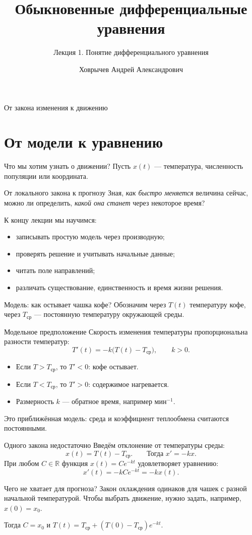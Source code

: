 \documentclass[aspectratio=169,11pt]{beamer}
\title[Понятие ОДУ]{Обыкновенные дифференциальные уравнения}
\subtitle{Лекция 1. Понятие дифференциального уравнения}
\author[Ховрычев А. А.]{Ховрычев Андрей Александрович}
\institute[УрФУ]{ФИИТ, УрФУ}
\date{}
\newcommand{\R}{\mathbb R}
\begin{document}
\begin{frame}
  \titlepage
  \centering От закона изменения к движению
\end{frame}

\section{От модели к уравнению}
\begin{frame}{Что мы хотим узнать о движении?}
  Пусть $x(t)$ --- температура, численность популяции или координата.
  \begin{block}{От локального закона к прогнозу}
    Зная, \emph{как быстро меняется} величина сейчас, можно ли определить,
    \emph{какой она станет} через некоторое время?
  \end{block}
  К концу лекции мы научимся:
  \begin{itemize}
    \item записывать простую модель через производную;
    \item проверять решение и учитывать начальные данные;
    \item читать поле направлений;
    \item различать существование, единственность и время жизни решения.
  \end{itemize}
\end{frame}

\begin{frame}{Модель: как остывает чашка кофе?}
  Обозначим через $T(t)$ температуру кофе, через $T_{\text{ср}}$ ---
  постоянную температуру окружающей среды.
  \begin{block}{Модельное предположение}
    Скорость изменения температуры пропорциональна разности температур:
    \[
      \boxed{T'(t)=-k\bigl(T(t)-T_{\text{ср}}\bigr)},\qquad k>0.
    \]
  \end{block}
  \begin{itemize}
    \item Если $T>T_{\text{ср}}$, то $T'<0$: кофе остывает.
    \item Если $T<T_{\text{ср}}$, то $T'>0$: содержимое нагревается.
    \item Размерность $k$ --- обратное время, например $\text{мин}^{-1}$.
  \end{itemize}
  Это приближённая модель: среда и коэффициент теплообмена считаются постоянными.
\end{frame}

\begin{frame}{Одного закона недостаточно}
  Введём отклонение от температуры среды:
  \[
    x(t)=T(t)-T_{\text{ср}}.\qquad \text{Тогда } x'=-kx.
  \]
  При любом $C\in\R$ функция $x(t)=Ce^{-kt}$ удовлетворяет уравнению:
  \[
    x'(t)=-kCe^{-kt}=-kx(t).
  \]
  \begin{alertblock}{Чего не хватает для прогноза?}
    Закон охлаждения одинаков для чашек с разной начальной температурой.
    Чтобы выбрать движение, нужно задать, например, $x(0)=x_0$.
  \end{alertblock}
  Тогда $C=x_0$ и $T(t)=T_{\text{ср}}+(T(0)-T_{\text{ср}})e^{-kt}$.
\end{frame}
\end{document}
